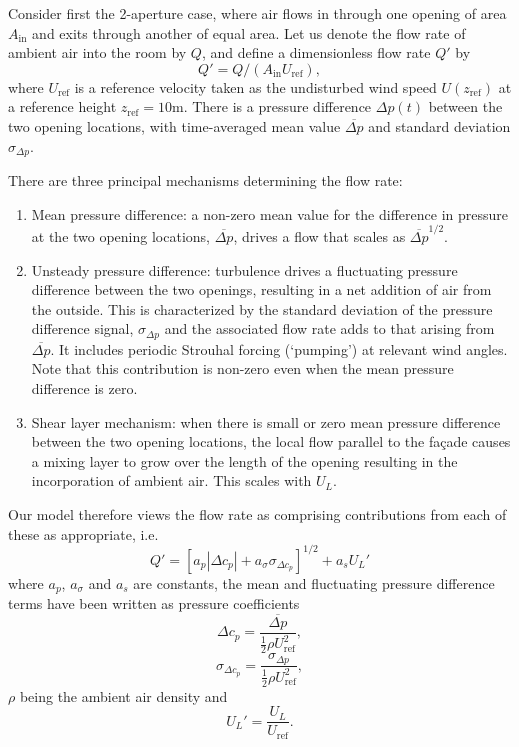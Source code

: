 Consider first the 2-aperture case, where air flows in through one opening of area
$A_\textrm{in}$ and exits through another of equal area. Let us denote the flow rate
of ambient air into the room by $Q$, and define a dimensionless flow rate $Q'$ by
\begin{equation}
Q'=Q/(A_\textrm{in} U_\textrm{ref}),
\end{equation}
where $U_\textrm{ref}$ is a reference velocity taken as the undisturbed wind speed
$U(z_\textrm{ref})$ at a reference height $z_\textrm{ref} = 10 \textrm{m}$. There is a
pressure difference $\Delta p(t)$ between the two opening locations, with time-averaged
mean value $\overline{\Delta p}$ and standard deviation $\sigma_{\Delta p}$.

There are three principal mechanisms determining the flow rate:

\begin{enumerate}[label=(\alph*)]
\item Mean pressure difference:  a non-zero mean value for the difference in pressure
at the two opening locations, $\overline{\Delta p}$, drives a flow that scales as
$\overline{\Delta p}^{1/2}$.\label{ss-mean-mech}
\item Unsteady pressure difference: turbulence drives a fluctuating pressure difference
between the two openings, resulting in a net addition of air from the outside. This is
characterized by the standard deviation of the pressure difference signal,
$\sigma_{\Delta p}$ and the associated flow rate adds to that arising from
$\overline{\Delta p}$. It includes periodic Strouhal forcing (`pumping') at relevant
wind angles. Note that this contribution is non-zero even when the mean pressure
difference is zero.\label{ss-unsteady-mech}
\item Shear layer mechanism: when there is small or zero mean pressure difference
between the two opening locations, the local flow parallel to the fa\c{c}ade causes a
mixing layer to grow over the length of the opening resulting in the incorporation of
ambient air. This scales with $U_L$.\label{ss-shear-mech}
\end{enumerate}

Our model therefore views the flow rate as comprising contributions from each of these
as appropriate, i.e.
\begin{equation}
Q'=\left[a_p |\Delta c_p |+a_\sigma \sigma_{\Delta c_p} \right]^{1/2}+a_s U_L'
\end{equation}
where $a_p$, $a_\sigma$ and $a_s$ are constants, the mean and fluctuating pressure
difference terms have been written as pressure coefficients
\begin{equation}
\Delta c_p=\frac{\overline{\Delta p}}{\frac{1}{2} \rho U_\textrm{ref}^2},
\end{equation}
\begin{equation}
\sigma_{\Delta c_p}=\frac{\sigma_{\Delta p}}{\frac{1}{2} \rho U_\textrm{ref}^2},
\end{equation}
$\rho$ being the ambient air density and
\begin{equation}
U_L'=\frac{U_L}{U_\textrm{ref}}.
\end{equation}


